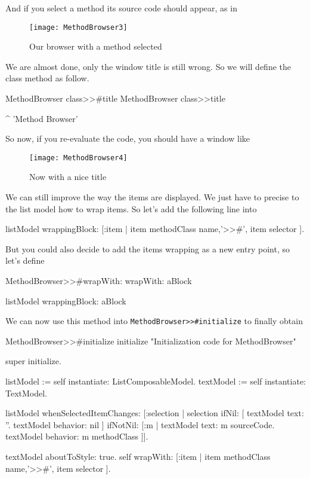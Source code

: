 \documentclass[a4paper,10pt,twoside]{book}
\begin{document}
And if you select a method its source code should appear, as in 

\begin{figure}[ht]
\begin{center}
	\texttt{[image: MethodBrowser3]}
	\caption{Our browser with a method selected}
\end{center}
\end{figure}

We are almost done, only the window title is still wrong.
So we will define the class method  as follow.
%
\begin{method}{MethodBrowser class>>\#title}
MethodBrowser class>>title

	^ 'Method Browser'
\end{method}

So now, if you re-evaluate the code, you should have a window like 

\begin{figure}[ht]
\begin{center}
	\texttt{[image: MethodBrowser4]}
	\caption{Now with a nice title}
\end{center}
\end{figure}

We can still improve the way the items are displayed. We just have to precise to the list model how to wrap items.
So let's add the following line into 
\begin{code}{}
listModel wrappingBlock: [:item | item methodClass name,'>>#', item selector ].
\end{code}


But you could also decide to add the items wrapping as a new entry point, so let's define 
\begin{method}{MethodBrowser>>\#wrapWith:}
wrapWith: aBlock

	listModel wrappingBlock: aBlock
\end{method}

We can now use this method into \verb+MethodBrowser>>#initialize+ to finally obtain
\begin{method}{MethodBrowser>>\#initialize}
initialize
	"Initialization code for MethodBrowser"

	super initialize.

	listModel := self instantiate: ListComposableModel.
	textModel := self instantiate: TextModel.
		
	listModel whenSelectedItemChanges: [:selection |
		selection
			ifNil: [
				textModel text: ''.
				textModel behavior: nil ]
			ifNotNil: [:m | 
				textModel text: m sourceCode.
				textModel behavior: m methodClass ]].
	
	textModel aboutToStyle: true.
	self wrapWith: [:item | item methodClass name,'>>#', item selector ].
\end{method}
\end{document}
